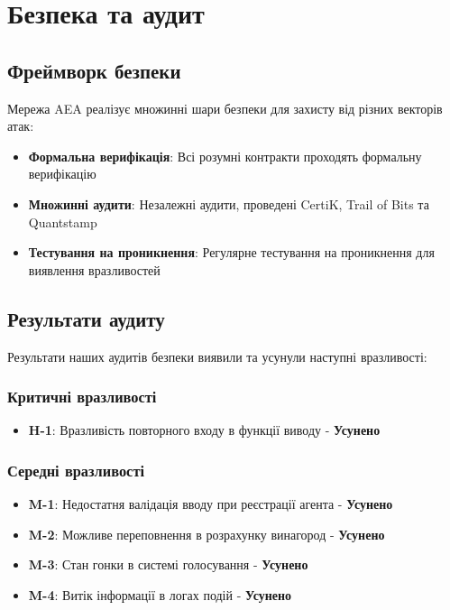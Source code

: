 \documentclass[12pt,a4paper]{article}
\begin{document}
\section{Безпека та аудит}

\subsection{Фреймворк безпеки}

Мережа AEA реалізує множинні шари безпеки для захисту від різних векторів атак:

\begin{itemize}
\item \textbf{Формальна верифікація}: Всі розумні контракти проходять формальну верифікацію
\item \textbf{Множинні аудити}: Незалежні аудити, проведені CertiK, Trail of Bits та Quantstamp
\item \textbf{Тестування на проникнення}: Регулярне тестування на проникнення для виявлення вразливостей
\end{itemize}

\subsection{Результати аудиту}

Результати наших аудитів безпеки виявили та усунули наступні вразливості:

\subsubsection{Критичні вразливості}
\begin{itemize}
\item \textbf{H-1}: Вразливість повторного входу в функції виводу - \textbf{Усунено}
\end{itemize}

\subsubsection{Середні вразливості}
\begin{itemize}
\item \textbf{M-1}: Недостатня валідація вводу при реєстрації агента - \textbf{Усунено}
\item \textbf{M-2}: Можливе переповнення в розрахунку винагород - \textbf{Усунено}
\item \textbf{M-3}: Стан гонки в системі голосування - \textbf{Усунено}
\item \textbf{M-4}: Витік інформації в логах подій - \textbf{Усунено}
\end{itemize}
\end{document}
